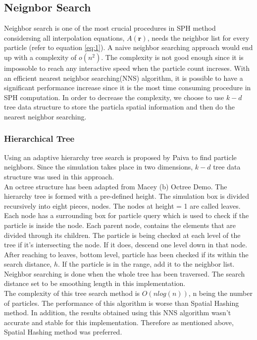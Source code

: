     \subsection{Neignbor Search}
    Neighbor search is one of the most crucial procedures in SPH method considersing all interpolation equations, $A(\textbf{r})$, needs the neighbor list for every particle (refer to equation \ref{eq:1}). A naive neighbor searching approach would end up with a complexity of $o(n^2)$. The complexity is not good enough since it is impossoble to reach any interactive speed when the particle count increses. With an efficient nearest neighbor searching(NNS) algorithm, it is possible to have a significant performance increase since it is the most time consuming procedure in SPH computation. In order to decrease the complexity, we choose to use $k-d$ tree data structure to store the particla spatial information and then do the nearest neighbor searching.

        \subsubsection{Hierarchical Tree}
        Using an adaptive hierarchy tree search is proposed by Paiva\cite{paiva2006particle} to find particle neighbors. Since the simulation takes place in two dimensions, $k-d$ tree data structure was used in this approach. \\

        An octree structure has been adapted from Macey (b) Octree Demo. The hierarchy tree is formed with a pre-defined height. The simulation box is divided recursively into eight pieces, nodes. The nodes at height = 1 are called leaves. Each node has a surrounding box for particle query which is used to check if the particle is inside the node. Each parent node, contains the elements that are divided through its children. The particle is being checked at each level of the tree if it’s intersecting the node. If it does, descend one level down in that node. After reaching to leaves, bottom level, particle has been checked if its within the search distance, $h$. If the particle is in the range, add it to the neighbor list. Neighbor searching is done when the whole tree has been traversed. The search distance set to be smoothing length in this implementation. \\

        The complexity of this tree search method is $O(nlog(n))$, n being the number of particles. The performance of this algorithm is worse than Spatial Hashing method. In addition, the results obtained using this NNS algorithm wasn’t accurate and stable for this implementation. Therefore as mentioned above, Spatial Hashing method was preferred.


